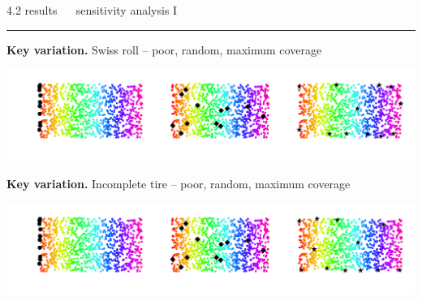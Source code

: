 \documentclass[11pt, compress, t, notes = noshow, xcolor = table, 
aspectratio = 1610]{beamer}
\begin{document}
\LARGE
\begin{frame}{\textcolor{gray!90}{4.2 results} ~~ sensitivity analysis I}
\normalsize
\vspace{-0.5cm}
\noindent \textcolor{gray!90}{\rule{\textwidth}{1pt}}
\smallskip

\textbf{Key variation.} Swiss roll -- poor, random, maximum coverage

\includegraphics[trim = 40 20 0 0, clip, %
    width = \textwidth]{figures/sensitivity_landmarks_key_swiss}
    
    
\textbf{Key variation.} Incomplete tire -- poor, random, maximum coverage

\includegraphics[trim = 40 20 0 0, clip, %
    width = \textwidth]{figures/sensitivity_landmarks_key_tire}    
    
\end{frame}

\end{document}
